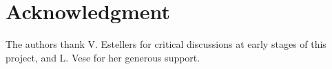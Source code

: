 \section*{Acknowledgment}


The authors thank V. Estellers for critical discussions
at early stages of this project, and L. Vese for her generous support.
